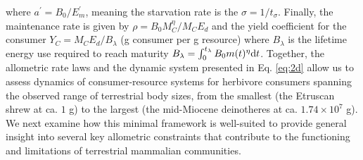 \documentclass[11pt]{article}
\begin{document}
where $a^\prime = B_0/E^\prime_m$, meaning the starvation rate is the $\sigma = 1/t_\sigma$.
Finally, the maintenance rate is given by $\rho = B_0 M_C^\eta/M_C E_d$ and the yield coefficient for the consumer $Y_C = M_C E_d/B_\lambda$ (g consumer per g resource) where $B_\lambda$ is the lifetime energy use required to reach maturity $B_\lambda = \int_0^{t_\lambda} B_0 m(t)^\eta {\rm d}t$.
Together, the allometric rate laws and the dynamic system presented in Eq. \ref{eq:2d} allow us to assess dynamics of consumer-resource systems for herbivore consumers spanning the observed range of terrestrial body sizes, from the smallest (the Etruscan shrew at ca. $1$ g) to the largest (the mid-Miocene deinotheres at ca. $1.74\times10^7$ g).
We next examine how this minimal framework is well-suited to provide general insight into several key allometric constraints that contribute to the functioning and limitations of terrestrial mammalian communities.












\end{document}
